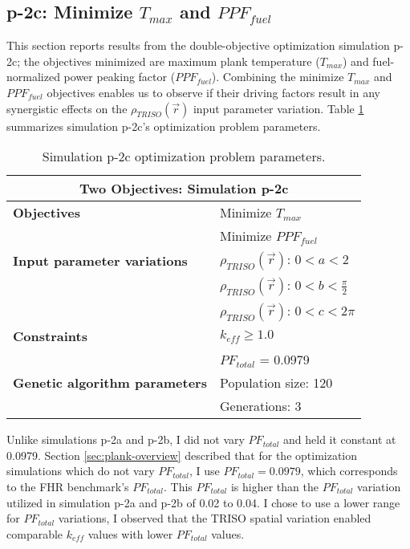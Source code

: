 \subsection{p-2c: Minimize $T_{max}$ and $PPF_{fuel}$}
\label{sec:p-2c}
This section reports results from the double-objective optimization simulation p-2c; the 
objectives minimized are maximum plank temperature ($T_{max}$) and fuel-normalized 
power peaking factor ($PPF_{fuel}$).  
Combining the minimize $T_{max}$ and $PPF_{fuel}$ objectives enables us to observe if 
their driving factors result in any synergistic effects on the
$\rho_{TRISO}(\vec{r})$ input parameter variation. 
Table \ref{tab:simulationp2c} summarizes simulation p-2c's optimization problem parameters. 
\begin{table}[htbp!]
    \centering
    \onehalfspacing
    \caption{Simulation p-2c optimization problem parameters.}
	\label{tab:simulationp2c}
    \footnotesize
    \begin{tabular}{l|p{4cm}}
    \hline 
    \multicolumn{2}{c}{\textbf{Two Objectives: Simulation p-2c}} \\
    \hline 
    \textbf{Objectives} & Minimize $T_{max}$ \\
    & Minimize $PPF_{fuel}$ \\
    \hline 
    \textbf{Input parameter variations} 
    & $\rho_{TRISO}(\vec{r})$: $0<a<2$ \\
    & $\rho_{TRISO}(\vec{r})$: $0<b<\frac{\pi}{2}$ \\
    & $\rho_{TRISO}(\vec{r})$: $0<c<2\pi$ \\
    \hline
    \textbf{Constraints} & $k_{eff} \geq 1.0$\\ 
    & $PF_{total}$ = 0.0979\\
    \hline 
    \textbf{Genetic algorithm parameters} & Population size: 120 \\
    & Generations: 3 \\
    \hline
    \end{tabular}
\end{table}
Unlike simulations p-2a and p-2b, I did not vary $PF_{total}$ and held it constant at 
0.0979. 
Section \ref{sec:plank-overview} described that for the optimization simulations which 
do not vary $PF_{total}$, I use $PF_{total} = 0.0979$, which corresponds to the 
\gls{FHR} benchmark's $PF_{total}$.  
This $PF_{total}$ is higher than the $PF_{total}$ variation utilized in simulation p-2a 
and p-2b of 0.02 to 0.04. 
I chose to use a lower range for $PF_{total}$ variations, I observed that the TRISO 
spatial variation enabled comparable $k_{eff}$ values with lower $PF_{total}$ values. 

